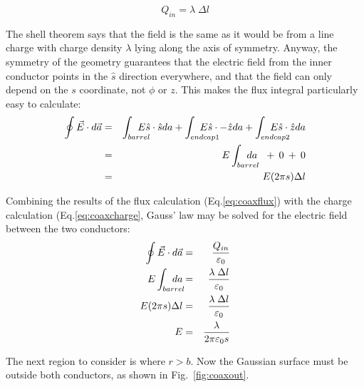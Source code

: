 \documentclass[12pt]{article}
\begin{document}
\begin{flushleft}
\begin{equation}
Q_{in}=\lambda \; \Delta l
\label{eq:coaxcharge}
\end{equation}

The shell theorem says that the field is the same as it would be from a line charge with charge density $\lambda$ lying along the axis of symmetry.  Anyway, the symmetry of the geometry guarantees that the electric field from the inner conductor points in the $\hat{s}$ direction everywhere, and that the field can only depend on the $s$ coordinate, not $\phi$ or $z$.  This makes the flux integral particularly easy to calculate:
\begin{eqnarray}
\oint \vec{E} \cdot d\vec{a} & = & \int_{barrel} \hspace{-.2in} E\hat{s} \cdot\hat{s} da + \int_{endcap1} \hspace{-.3in} E\hat{s} \cdot -\hat{z} da + \int_{endcap2} \hspace{-.3in} E\hat{s} \cdot \hat{z} da \nonumber \\
\vspace{.1in}
 & = & E\int_{barrel} \hspace{-.2in} da \hspace{.1in} + \: 0 \: + \:0 \nonumber\\
 \vspace{.2in}
 & = & E (2\pi s) \Delta l 
\label{eq:coaxflux}
\end{eqnarray}

Combining the results of the flux calculation (Eq.\ref{eq:coaxflux}) with the charge calculation (Eq.\ref{eq:coaxcharge}, Gauss' law may be solved for the electric field between the two conductors:
\begin{eqnarray}
\oint \vec{E} \cdot d\vec{a} & = & \frac{Q_{in}}{\varepsilon_{0}} \nonumber \\
 E\int_{barrel} \hspace{-.2in} da & =  &  \frac{\lambda \; \Delta l}{\varepsilon_{0}} \nonumber \\
E (2\pi s) \Delta l  & = & \frac{\lambda \; \Delta l}{\varepsilon_{0}} \nonumber \\
E & =& \frac{\lambda}{2\pi \varepsilon_{0} s}
\label{eq:what?}
\end{eqnarray}

The next region to consider is where $r>b$.  Now the Gaussian surface must be outside both conductors, as shown in Fig.~\ref{fig:coaxout}.


\end{flushleft}
\end{document}

